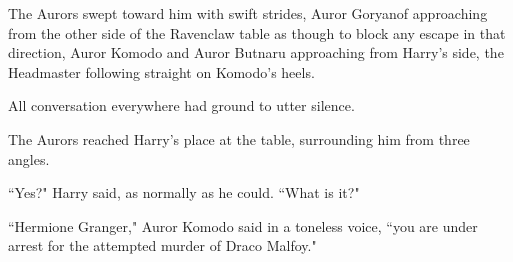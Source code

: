 The Aurors swept toward him with swift strides, Auror Goryanof approaching from the other side of the Ravenclaw table as though to block any escape in that direction, Auror Komodo and Auror Butnaru approaching from Harry's side, the Headmaster following straight on Komodo's heels.

All conversation everywhere had ground to utter silence.

The Aurors reached Harry's place at the table, surrounding him from three angles.

``Yes?" Harry said, as normally as he could. ``What is it?"

``Hermione Granger," Auror Komodo said in a toneless voice, ``you are under arrest for the attempted murder of Draco Malfoy."

